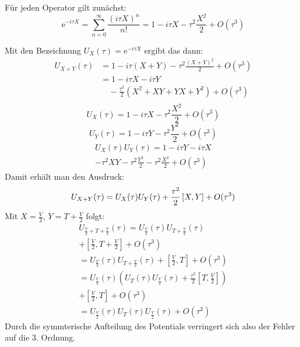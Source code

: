 \documentclass[10pt,a4paper,german]{scrartcl}
\begin{document}
		Für jeden Operator gilt zunächst:
		\begin{equation*}
			\mathrm{e}^{- i \tau X}
				= \sum_{n=0}^{\infty} \frac{(i \tau X)^n}{n!}
				= 1 - i \tau X - \tau^2 \frac{X^2}{2} + O(\tau^3)
		\end{equation*}

		Mit den Bezeichnung	$U_X(\tau)=\mathrm{e}^{-i \tau X}$ ergibt das dann:
		\begin{align*}
			U_{X+Y}(\tau) &= 1 - i \tau (X+Y) -\tau^2 \frac{(X+Y)^2}{2} + O(\tau^3)\\
							&= 1 - i \tau X - i \tau Y\\
							&\quad-\frac{\tau^2}{2} \left(	X^2 + X Y + Y X + Y^2 \right)
							+ O(\tau^3)\\
		\end{align*}
		\begin{equation*}
			U_X(\tau) = 1 - i \tau X -\tau^2 \frac{X^2}{2} + O(\tau^3)
		\end{equation*}
		\begin{equation*}
			U_Y(\tau) = 1 - i \tau Y -\tau^2 \frac{Y^2}{2} + O(\tau^3)
		\end{equation*}
		\begin{multline*}
			U_X(\tau) U_Y(\tau) =
				1
				- i \tau Y - i \tau X\\
				- \tau^2 X Y
				- \tau^2 \frac{Y^2}{2}
				- \tau^2 \frac{X^2}{2}
				+ O(\tau^3)
		\end{multline*}
		Damit erhält man den Ausdruck:
		\begin{equation}\label{eq:expand}
			U_{X+Y}(\tau) = U_X(\tau)U_Y(\tau)
				+ \frac{\tau^2}{2} \left[X,Y\right]	+ O(\tau^3)\\
		\end{equation}
		Mit $X=\frac{V}{2}$, $Y=T+\frac{V}{2}$ folgt:
		\begin{multline}
			U_{\frac{V}{2}+T+\frac{V}{2}}(\tau)
				= U_{\frac{V}{2}}(\tau)U_{T+\frac{V}{2}}(\tau) \\
					+ \left[\frac{V}{2},T+\frac{V}{2}\right]	+ O(\tau^3)\\
				= U_{\frac{V}{2}}(\tau)U_{T+\frac{V}{2}}(\tau)
					+ \left[\frac{V}{2},T\right]	+ O(\tau^3)\\
				= U_{\frac{V}{2}}(\tau)
						\left(
							U_T(\tau)U_{\frac{V}{2}}(\tau)
								+ \frac{\tau^2}{2} \left[T,\frac{V}{2}\right]
						\right)\\
					+ \left[\frac{V}{2},T\right]	+ O(\tau^3)\\
				= U_{\frac{V}{2}}(\tau) U_T(\tau) U_{\frac{V}{2}}(\tau) + O(\tau^3)
		\end{multline}
		Durch die symmterische Aufteilung des Potentials verringert sich also
		der Fehler auf die 3. Ordnung.
\end{document}
